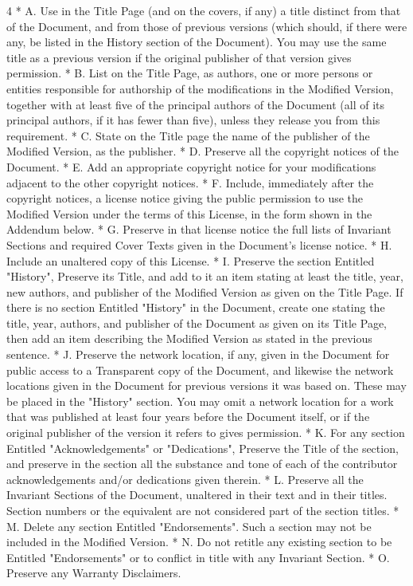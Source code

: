 \documentclass[fontsize=11pt,paper=A4,BCOR=12mm,DIV=13,open=any,listof=totoc,toc=flat]{scrbook}
\begin{document}
{\begin{multicols}{4}
    * A. Use in the Title Page (and on the covers, if any) a title distinct from that of the Document, and from those of previous versions (which should, if there were any, be listed in the History section of the Document). You may use the same title as a previous version if the original publisher of that version gives permission.
    * B. List on the Title Page, as authors, one or more persons or entities responsible for authorship of the modifications in the Modified Version, together with at least five of the principal authors of the Document (all of its principal authors, if it has fewer than five), unless they release you from this requirement.
    * C. State on the Title page the name of the publisher of the Modified Version, as the publisher.
    * D. Preserve all the copyright notices of the Document.
    * E. Add an appropriate copyright notice for your modifications adjacent to the other copyright notices.
    * F. Include, immediately after the copyright notices, a license notice giving the public permission to use the Modified Version under the terms of this License, in the form shown in the Addendum below.
    * G. Preserve in that license notice the full lists of Invariant Sections and required Cover Texts given in the Document's license notice.
    * H. Include an unaltered copy of this License.
    * I. Preserve the section Entitled "History", Preserve its Title, and add to it an item stating at least the title, year, new authors, and publisher of the Modified Version as given on the Title Page. If there is no section Entitled "History" in the Document, create one stating the title, year, authors, and publisher of the Document as given on its Title Page, then add an item describing the Modified Version as stated in the previous sentence.
    * J. Preserve the network location, if any, given in the Document for public access to a Transparent copy of the Document, and likewise the network locations given in the Document for previous versions it was based on. These may be placed in the "History" section. You may omit a network location for a work that was published at least four years before the Document itself, or if the original publisher of the version it refers to gives permission.
    * K. For any section Entitled "Acknowledgements" or "Dedications", Preserve the Title of the section, and preserve in the section all the substance and tone of each of the contributor acknowledgements and/or dedications given therein.
    * L. Preserve all the Invariant Sections of the Document, unaltered in their text and in their titles. Section numbers or the equivalent are not considered part of the section titles.
    * M. Delete any section Entitled "Endorsements". Such a section may not be included in the Modified Version.
    * N. Do not retitle any existing section to be Entitled "Endorsements" or to conflict in title with any Invariant Section.
    * O. Preserve any Warranty Disclaimers.


\end{multicols}}
\end{document}
